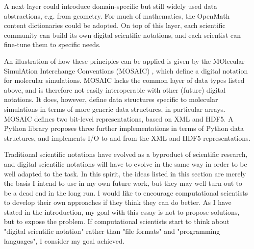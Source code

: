 A next layer could introduce domain-specific but still widely used data abstractions, e.g. from geometry. For much of mathematics, the OpenMath content dictionaries \cite{openmath_society_openmath_2000} could be adopted. On top of this layer, each scientific community can build its own digital scientific notations, and each scientist can fine-tune them to specific needs.

An illustration of how these principles can be applied is given by the MOlecular SimulAtion Interchange Conventions (MOSAIC) \cite{hinsen_mosaic_2014}, which define a digital notation for molecular simulations. MOSAIC lacks the common layer of data types listed above, and is therefore not easily interoperable with other (future) digital notations. It does, however, define data structures specific to molecular simulations in terms of more generic data structures, in particular arrays. MOSAIC defines two bit-level representations, based on XML and HDF5. A Python library \cite{hinsen_pymosaic_2014} proposes three further implementations in terms of Python data structures, and implements I/O to and from the XML and HDF5 representations.

Traditional scientific notations have evolved as a byproduct of scientific research, and digital scientific notations will have to evolve in the same way in order to be well adapted to the task. In this spirit, the ideas listed in this section are merely the basis I intend to use in my own future work, but they may well turn out to be a dead end in the long run. I would like to encourage computational scientists to develop their own approaches if they think they can do better. As I have stated in the introduction, my goal with this essay is not to propose solutions, but to expose the problem. If computational scientists start to think about "digital scientific notation" rather than "file formats" and "programming languages", I consider my goal achieved.







\]